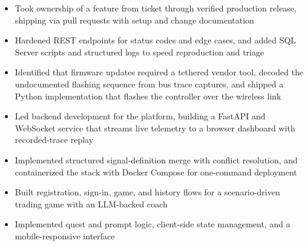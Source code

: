 \documentclass[10pt,letterpaper]{article}
\begin{document}
\entryspace

\begin{itemize}
  \item Took ownership of a feature from ticket through verified production release, shipping via pull requests with setup and change documentation
  \item Hardened REST endpoints for status codes and edge cases, and added SQL Server scripts and structured logs to speed reproduction and triage
\end{itemize}


\begin{itemize}
  \item Identified that firmware updates required a tethered vendor tool, decoded the undocumented flashing sequence from bus trace captures, and shipped a Python implementation that flashes the controller over the wireless link
  \item Led backend development for the platform, building a FastAPI and WebSocket service that streams live telemetry to a browser dashboard with recorded-trace replay
  \item Implemented structured signal-definition merge with conflict resolution, and containerized the stack with Docker Compose for one-command deployment
\end{itemize}

\entryspace

\begin{itemize}
  \item Built registration, sign-in, game, and history flows for a scenario-driven trading game with an LLM-backed coach
  \item Implemented quest and prompt logic, client-side state management, and a mobile-responsive interface
\end{itemize}
\end{document}
